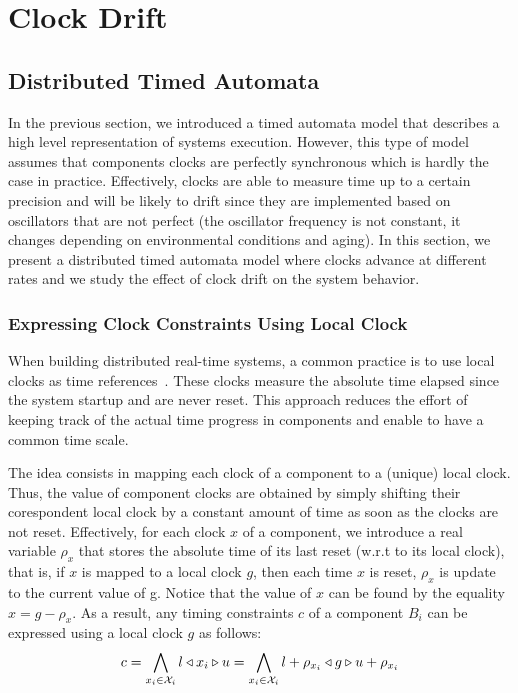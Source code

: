 \chapter{Clock Drift}\label{chap:6}
\minitoc
\section{Distributed Timed Automata}
\label{sec:3}

In the previous section, we introduced a timed automata model that 
describes a high level representation of systems execution. 
However, this type of model assumes that components clocks are perfectly synchronous which is 
hardly the case in practice.
Effectively, clocks are able to measure time up to a certain precision and will be likely
to drift since they are implemented based on oscillators that are not perfect (the oscillator frequency 
is not constant, it changes depending on environmental conditions and aging).
In this section, we present a distributed timed automata model where clocks advance at different rates
and we study the effect of clock drift on the system behavior.
 
\subsection{Expressing Clock Constraints Using Local Clock}

When building distributed real-time systems, a common practice is to use 
local clocks as time references~\cite{ahlem:conf_free,ahlem:these}.
These clocks measure the absolute time elapsed 
since the system startup and are never reset. 
This approach reduces the effort of keeping track of the actual time progress in components
and enable to have a common time scale. 

The idea consists in mapping each clock of a component to a (unique) local clock.
Thus, the value of component clocks are obtained by simply shifting their corespondent local clock 
by a constant amount of time as soon as the clocks are not reset.
Effectively, for each clock $x$ of a component, we introduce a real variable $\rho_x$ that stores the absolute
time of its last reset (w.r.t to its local clock), that is, if $x$ is mapped to a local clock $g$,
then each time $x$ is reset, $\rho_x$ is update to the current value of g.
Notice that the value of $x$ can be found by the equality $x=g-\rho_x$.
As a result, any timing constraints $c$ of a component $B_i$ can be expressed using a local clock $g$ as follows:
\begin{equation}
  \label{eq:glob}
  c = \bigwedge_{x_i\in\mathcal{X}_i} l\triangleleft x_i\triangleright u
    =\bigwedge_{x_i\in\mathcal{X}_i} l+\rho_{x_i}\triangleleft g\triangleright u+\rho_{x_i}
\end{equation}

